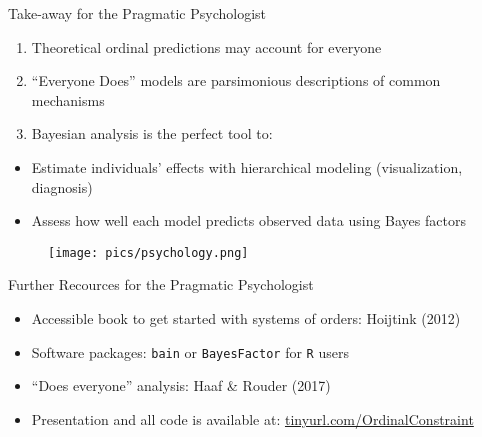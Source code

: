 \documentclass[ignorenonframetext,t]{beamer}
\providecommand{\tightlist}{%
  \setlength{\itemsep}{0pt}\setlength{\parskip}{0pt}}
\begin{document}
\begin{frame}{Take-away for the Pragmatic Psychologist}

\vspace*{.5cm}

\begin{enumerate}[<+->]
\def\labelenumi{\arabic{enumi}.}
\tightlist
\item
  Theoretical ordinal predictions may account for everyone
\item
  ``Everyone Does'' models are parsimonious descriptions of common
  mechanisms
\item
  Bayesian analysis is the perfect tool to:
\end{enumerate}

\begin{itemize}[<+->]
\tightlist
\item
  Estimate individuals' effects with hierarchical modeling
  (visualization, diagnosis)
\item
  Assess how well each model predicts observed data using Bayes factors
\end{itemize}

\vspace*{.5cm}

\begin{figure}
\hfill
\texttt{[image: pics/psychology.png]}
\end{figure}

\end{frame}

\begin{frame}[fragile]{Further Recources for the Pragmatic Psychologist}

\vspace*{1cm}

\begin{itemize}
\item
  Accessible book to get started with systems of orders: Hoijtink (2012)
\item
  Software packages: \texttt{bain} or \texttt{BayesFactor} for
  \texttt{R} users
\item
  ``Does everyone'' analysis: Haaf \& Rouder (2017)
\item
  Presentation and all code is available at: \color{blue}
  \href{https://tinyurl.com/OrdinalConstraint}{tinyurl.com/OrdinalConstraint}
\end{itemize}

\end{frame}
\end{document}
